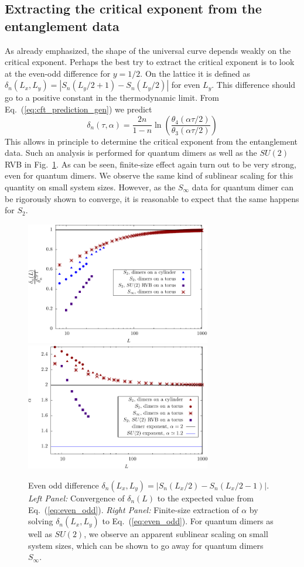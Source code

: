 \documentclass[11pt]{iopart}
\begin{document}
\subsection{Extracting the critical exponent from the entanglement data}
\label{sec:extraction}
As already emphasized, the shape of the universal curve depends weakly on the critical exponent. 
Perhaps the best try to extract the critical exponent is to look at the even-odd difference for $y=1/2$. On the lattice it is defined as $\delta_n(L_x,L_y)=\left|S_n(L_y/2+1)-S_n(L_y/2)\right|$ for even $L_y$. This difference should go to a positive constant in the thermodynamic limit. From Eq.~(\ref{eq:cft_prediction_gen}) we predict
\begin{equation}\label{eq:even_odd}
 \delta_n(\tau,\alpha)=\frac{2n}{1-n}\ln \left(\frac{\theta_4(\alpha\tau/2)}{\theta_3(\alpha \tau/2)}\right)
\end{equation}
This allows in principle to determine the critical exponent from the entanglement data. Such an analysis is performed for quantum dimers as well as the $SU(2)$ RVB in Fig.~\ref{fig:evenodd}. As can be seen, finite-size effect again turn out to be very strong, even for quantum dimers. We observe the same kind of sublinear scaling for this quantity on small system sizes\cite{Ju2012}. However, as the $S_\infty$ data for quantum dimer can be rigorously shown to converge, it is reasonable to expect that the same happens for $S_2$.
\begin{figure}[ht]
\begin{center}
 \includegraphics[width=8.1cm]{./figures/evenodd.pdf}
 \includegraphics[width=8.1cm]{./figures/evenodd_alpha.pdf}
 \end{center}
 \caption{Even odd difference $\delta_n(L_x,L_y)=|S_n(L_x/2)-S_n(L_x/2-1)|$. \emph{Left Panel:} Convergence of $\delta_n(L)$ to the expected value from Eq.~(\ref{eq:even_odd}). \emph{Right Panel:} Finite-size extraction of $\alpha$ by solving $\delta_n(L_x,L_y)$ to Eq.~(\ref{eq:even_odd}). For quantum dimers as well as $SU(2)$, we observe an apparent sublinear scaling on small system sizes, which can be shown to go away for quantum dimers $S_\infty$.}
 \label{fig:evenodd}
\end{figure}
\end{document}
